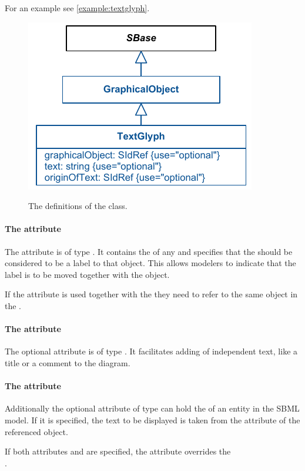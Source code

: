 For an example see \ref{example:textglyph}.

\begin{figure}[!ht]
\includegraphics{uml/layout-textglyph-uml}\\
\caption{The definitions of the \TextGlyph class.}
\label{uml:textglyph}
\end{figure}

\paragraph{The  attribute}
The attribute  is of type . It 
contains the  of any \GraphicalObject and specifies that the 
\TextGlyph should be considered to be a label to that object. This 
allows modelers to indicate that the label is to be moved together with the 
object. 

If the  attribute is used together with the  
they need to refer to the same object in the \LayoutClass.

\paragraph{The  attribute}
The optional  attribute is of type . It 
facilitates adding of independent text, like a title or a comment to the 
diagram. 

\paragraph{The  attribute}
Additionally the optional attribute  of type 
 can hold the  of an entity in the SBML 
model. If it is specified, the text to be displayed is taken from the 
 attribute of the referenced object. 

If both attributes  and  are specified, 
the  attribute overrides the \\ . 


